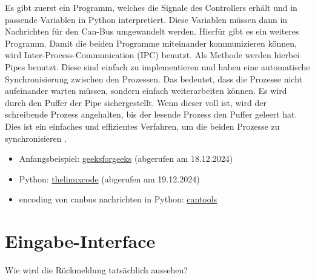 Es gibt zuerst ein Programm, welches die Signale des Controllers erhält und in passende Variablen in Python interpretiert. Diese Variablen müssen
dann in Nachrichten für den Can-Bus umgewandelt werden. Hierfür gibt es ein weiteres Programm. Damit die beiden Programme miteinander kommunizieren
können, wird Inter-Process-Communication (IPC) benutzt. Als Methode werden hierbei Pipes benutzt. Diese sind einfach zu implementieren und haben
eine automatische Synchronisierung zwischen den Prozessen. Das bedeutet, dass die Prozesse nicht aufeinander warten müssen, sondern einfach
weiterarbeiten können. Es wird durch den Puffer der Pipe sichergestellt. Wenn dieser voll ist, wird der schreibende Prozess angehalten, bis der
lesende Prozess den Puffer geleert hat. Dies ist ein einfaches und effizientes Verfahren, 
um die beiden Prozesse zu synchronisieren \cite{Venkataraman2015}. 

\begin{itemize}
    \item Anfangsbeispiel: \href{https://www.geeksforgeeks.org/inter-process-communication-ipc/}{geeksforgeeks} (abgerufen am 18.12.2024)
    \item Python: \href{https://thelinuxcode.com/python-pipe-example/}{thelinuxcode} (abgerufen am 19.12.2024)
    \item encoding von canbus nachrichten in Python: \href{https://cantools.readthedocs.io/en/latest/}{cantools}
\end{itemize}

\section{Eingabe-Interface}
Wie wird die Rückmeldung tatsächlich aussehen?